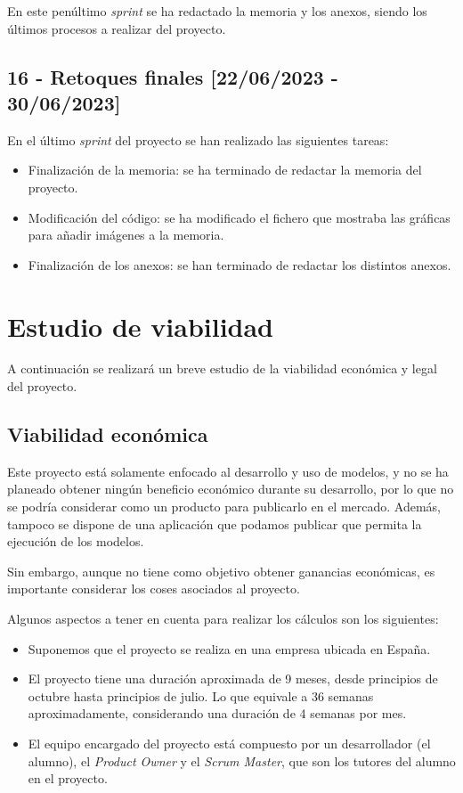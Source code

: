 En este penúltimo \textit{sprint} se ha redactado la memoria y los anexos, siendo los últimos procesos a realizar del proyecto.

\subsection{16 - Retoques finales [22/06/2023 - 30/06/2023]}

En el último \textit{sprint} del proyecto se han realizado las siguientes tareas:

\begin{itemize}
    \item Finalización de la memoria: se ha terminado de redactar la memoria del proyecto.
    \item Modificación del código: se ha modificado el fichero que mostraba las gráficas para añadir imágenes a la memoria.
    \item Finalización de los anexos: se han terminado de redactar los distintos anexos.
\end{itemize}

\section{Estudio de viabilidad}

A continuación se realizará un breve estudio de la viabilidad económica y legal del proyecto.

\subsection{Viabilidad económica}

Este proyecto está solamente enfocado al desarrollo y uso de modelos, y no se ha planeado obtener ningún beneficio económico durante su desarrollo, por lo que no se podría considerar como un producto para publicarlo en el mercado. Además, tampoco se dispone de una aplicación que podamos publicar que permita la ejecución de los modelos.

\par

Sin embargo, aunque no tiene como objetivo obtener ganancias económicas, es importante considerar los coses asociados al proyecto.

\par

Algunos aspectos a tener en cuenta para realizar los cálculos son los siguientes:

\begin{itemize}
    \item Suponemos que el proyecto se realiza en una empresa ubicada en España.
    \item El proyecto tiene una duración aproximada de 9 meses, desde principios de octubre hasta principios de julio. Lo que equivale a 36 semanas aproximadamente, considerando una duración de 4 semanas por mes.
    \item El equipo encargado del proyecto está compuesto por un desarrollador (el alumno), el \textit{Product Owner} y el \textit{Scrum Master}, que son los tutores del alumno en el proyecto.
\end{itemize}

